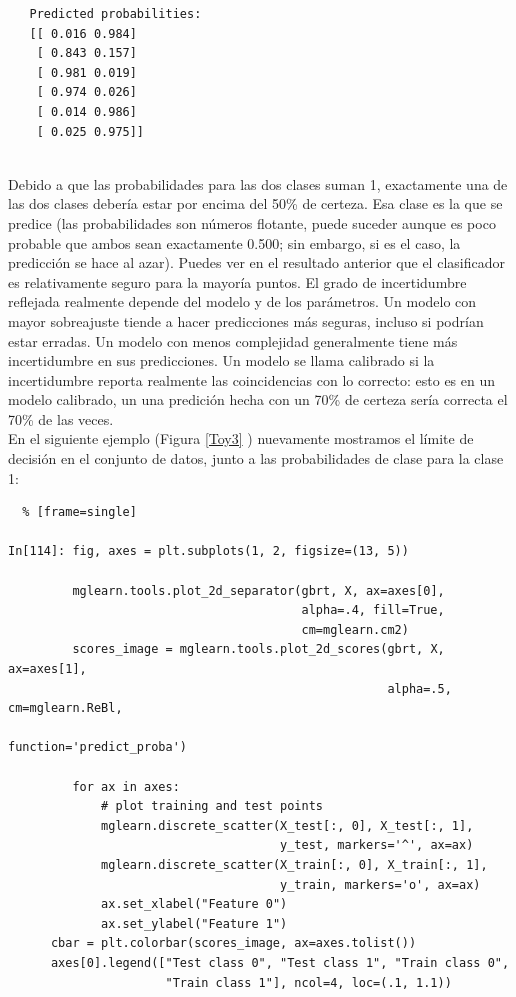 {\begin{lstlisting}
   Predicted probabilities:
   [[ 0.016 0.984]
    [ 0.843 0.157]
    [ 0.981 0.019]
    [ 0.974 0.026]
    [ 0.014 0.986]
    [ 0.025 0.975]]
    

\end{lstlisting} 



Debido a que las probabilidades para las dos clases suman 1, exactamente una de las dos  clases
debería estar por encima del 50\% de certeza. Esa clase es la que se predice (las probabilidades son números flotante, puede suceder aunque es poco probable que ambos sean exactamente 0.500; sin embargo, si es el caso, la predicción se hace al azar). Puedes ver en el resultado anterior que el clasificador es relativamente seguro para la mayoría puntos. El grado de incertidumbre reflejada  realmente  depende del modelo y de los parámetros.   Un modelo con  mayor  sobreajuste tiende a hacer predicciones más seguras, incluso si podrían estar erradas. Un modelo con menos complejidad generalmente tiene más   incertidumbre en sus predicciones.    Un modelo se llama calibrado si la incertidumbre reporta  realmente  las coincidencias  con lo correcto: esto es en un modelo calibrado, un una predición  hecha con un 70\% de certeza sería correcta el 70\% de las veces.\\ 
 

En el siguiente ejemplo (Figura \ref{Toy3} ) nuevamente mostramos el límite de decisión en el
conjunto de datos, junto a las probabilidades de clase para la clase 1:\\


\begin{lstlisting}  % [frame=single]	

In[114]: fig, axes = plt.subplots(1, 2, figsize=(13, 5))
   
         mglearn.tools.plot_2d_separator(gbrt, X, ax=axes[0], 
                                         alpha=.4, fill=True, 
                                         cm=mglearn.cm2)
         scores_image = mglearn.tools.plot_2d_scores(gbrt, X, ax=axes[1], 
                                                     alpha=.5, cm=mglearn.ReBl,
                                                     function='predict_proba')
       
         for ax in axes:
             # plot training and test points
             mglearn.discrete_scatter(X_test[:, 0], X_test[:, 1],
                                      y_test, markers='^', ax=ax)
             mglearn.discrete_scatter(X_train[:, 0], X_train[:, 1], 
                                      y_train, markers='o', ax=ax)
             ax.set_xlabel("Feature 0")
             ax.set_ylabel("Feature 1")
      cbar = plt.colorbar(scores_image, ax=axes.tolist())
      axes[0].legend(["Test class 0", "Test class 1", "Train class 0",
                      "Train class 1"], ncol=4, loc=(.1, 1.1))


\end{lstlisting}}

